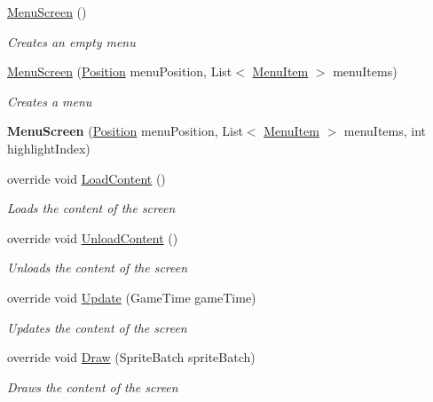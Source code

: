 \begin{DoxyCompactItemize}
\item 
\hyperlink{class_hel_project_1_1_u_i_1_1_menu_1_1_menu_screen_af65f39a4c1755b8f24f63b264863ae5a}{Menu\+Screen} ()
\begin{DoxyCompactList}\small\item\em Creates an empty menu \end{DoxyCompactList}\item 
\hyperlink{class_hel_project_1_1_u_i_1_1_menu_1_1_menu_screen_a92cd4cd4ff51a49cc34dcf71a4e28424}{Menu\+Screen} (\hyperlink{class_hel_project_1_1_tools_1_1_position}{Position} menu\+Position, List$<$ \hyperlink{class_hel_project_1_1_u_i_1_1_menu_1_1_menu_item}{Menu\+Item} $>$ menu\+Items)
\begin{DoxyCompactList}\small\item\em Creates a menu \end{DoxyCompactList}\item 
\hypertarget{class_hel_project_1_1_u_i_1_1_menu_1_1_menu_screen_a3743fe19d883d91c13da0884c155a4ba}{}{\bfseries Menu\+Screen} (\hyperlink{class_hel_project_1_1_tools_1_1_position}{Position} menu\+Position, List$<$ \hyperlink{class_hel_project_1_1_u_i_1_1_menu_1_1_menu_item}{Menu\+Item} $>$ menu\+Items, int highlight\+Index)\label{class_hel_project_1_1_u_i_1_1_menu_1_1_menu_screen_a3743fe19d883d91c13da0884c155a4ba}

\item 
override void \hyperlink{class_hel_project_1_1_u_i_1_1_menu_1_1_menu_screen_a6a739ee514c5c05b13a91c5f520a3352}{Load\+Content} ()
\begin{DoxyCompactList}\small\item\em Loads the content of the screen \end{DoxyCompactList}\item 
override void \hyperlink{class_hel_project_1_1_u_i_1_1_menu_1_1_menu_screen_ace5a0a823194e4b39c38e146959e00e1}{Unload\+Content} ()
\begin{DoxyCompactList}\small\item\em Unloads the content of the screen \end{DoxyCompactList}\item 
override void \hyperlink{class_hel_project_1_1_u_i_1_1_menu_1_1_menu_screen_af7295758606c3cb7124983c86a51ecae}{Update} (Game\+Time game\+Time)
\begin{DoxyCompactList}\small\item\em Updates the content of the screen \end{DoxyCompactList}\item 
override void \hyperlink{class_hel_project_1_1_u_i_1_1_menu_1_1_menu_screen_a6a7f006379781977088ac588430c8822}{Draw} (Sprite\+Batch sprite\+Batch)
\begin{DoxyCompactList}\small\item\em Draws the content of the screen \end{DoxyCompactList}\end{DoxyCompactItemize}

